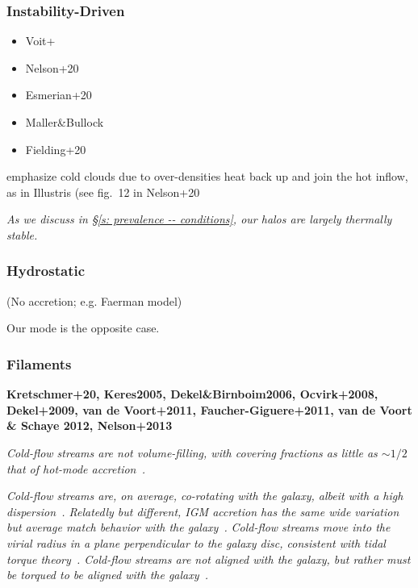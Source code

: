 \documentclass[fleqn,usenatbib]{mnras}
\begin{document}
\subsubsection{Instability-Driven}

\begin{itemize}
\item Voit+
\item  Nelson+20
\item  Esmerian+20
\item  Maller\&Bullock
\item Fielding+20
\end{itemize}
emphasize cold clouds due to over-densities heat back up and join the hot inflow, as in Illustris (see fig.~12 in Nelson+20

\textit{
As we discuss in \S\ref{s: prevalence -- conditions}, our halos are largely thermally stable.
}

\subsubsection{Hydrostatic}

(No accretion; e.g. Faerman model)

Our mode is the opposite case.


\subsubsection{Filaments}

\textbf{
Kretschmer+20,
Keres2005,
Dekel\&Birnboim2006,
Ocvirk+2008,
Dekel+2009,
van de Voort+2011,
Faucher-Giguere+2011,
van de Voort \& Schaye 2012,
Nelson+2013
}

\textit{
Cold-flow streams are not volume-filling, with covering fractions as little as $\sim 1/2$ that of hot-mode accretion~\citep[e.g.][]{Wright2021}.
}

\textit{
Cold-flow streams are, on average, co-rotating with the galaxy, albeit with a high dispersion~\citep[e.g.][]{Stewart2011a, danovich2012, Stewart2013, Stewart2017}.
Relatedly but different, IGM accretion has the same wide variation but average match behavior with the galaxy~\citep{Hafen2019}.
}
\textit{
Cold-flow streams move into the virial radius in a plane perpendicular to the galaxy disc, consistent with tidal torque theory~\citep{danovich2012}.
Cold-flow streams are not aligned with the galaxy, but rather must be torqued to be aligned with the galaxy~\cite{danovich2012, Danovich2015}.
}
\end{document}
